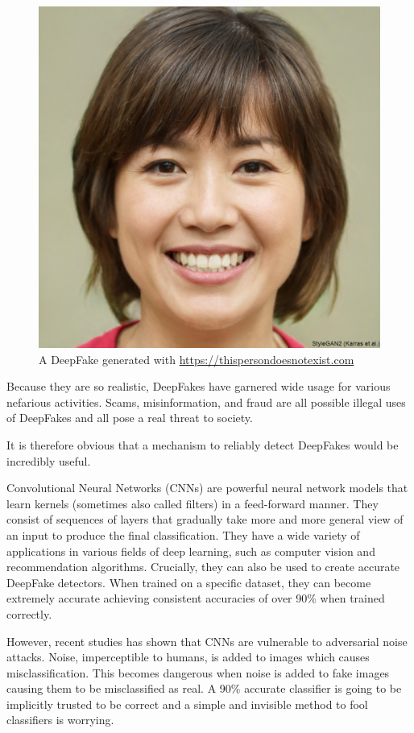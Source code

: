 \begin{figure}[h]
    \centering
    \includegraphics[width=0.5\linewidth]{dissertation//figures/thispersondoesnotexist.jpg}
    \caption{A DeepFake generated with \url{https://thispersondoesnotexist.com}}
    \label{fig:thispersondoesnotexist}
\end{figure}

Because they are so realistic, DeepFakes have garnered wide usage for various nefarious activities. Scams, misinformation, and fraud are all possible illegal uses of DeepFakes and all pose a real threat to society\cite{sensity2024state}.

It is therefore obvious that a mechanism to reliably detect DeepFakes would be incredibly useful.

Convolutional Neural Networks (CNNs) are powerful neural network models that learn kernels (sometimes also called filters) in a feed-forward manner\cite{lecun2015deep}. They consist of sequences of layers that gradually take more and more general view of an input to produce the final classification. They have a wide variety of applications in various fields of deep learning, such as computer vision and recommendation algorithms. Crucially, they can also be used to create accurate DeepFake detectors. When trained on a specific dataset, they can become extremely accurate achieving consistent accuracies of over 90\% when trained correctly\cite{papersiwthcodedeepfakedetection}.

However, recent studies has shown that CNNs are vulnerable to adversarial noise attacks. Noise, imperceptible to humans, is added to images which causes misclassification\cite{gandhi2020adversarial}. This becomes dangerous when noise is added to fake images causing them to be misclassified as real. A 90\% accurate classifier is going to be implicitly trusted to be correct and a simple and invisible method to fool classifiers is worrying.

